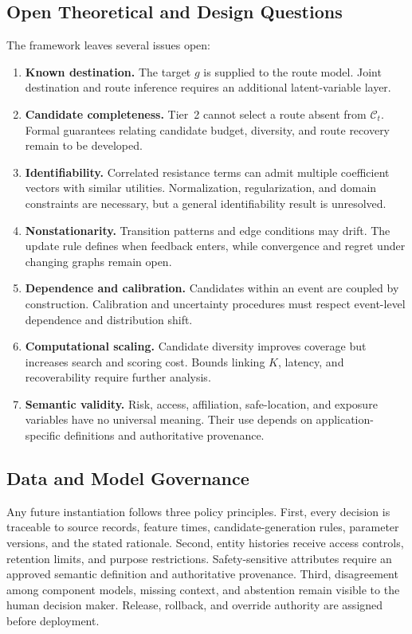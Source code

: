 \documentclass[11pt,letterpaper]{article}
\newcommand{\Ccal}{\mathcal{C}}
\begin{document}
\subsection{Open Theoretical and Design Questions}

The framework leaves several issues open:

\begin{enumerate}
  \item \textbf{Known destination.} The target $g$ is supplied to the route model. Joint destination and route inference requires an additional latent-variable layer.
  \item \textbf{Candidate completeness.} Tier~2 cannot select a route absent from $\Ccal_t$. Formal guarantees relating candidate budget, diversity, and route recovery remain to be developed.
  \item \textbf{Identifiability.} Correlated resistance terms can admit multiple coefficient vectors with similar utilities. Normalization, regularization, and domain constraints are necessary, but a general identifiability result is unresolved.
  \item \textbf{Nonstationarity.} Transition patterns and edge conditions may drift. The update rule defines when feedback enters, while convergence and regret under changing graphs remain open.
  \item \textbf{Dependence and calibration.} Candidates within an event are coupled by construction. Calibration and uncertainty procedures must respect event-level dependence and distribution shift.
  \item \textbf{Computational scaling.} Candidate diversity improves coverage but increases search and scoring cost. Bounds linking $K$, latency, and recoverability require further analysis.
  \item \textbf{Semantic validity.} Risk, access, affiliation, safe-location, and exposure variables have no universal meaning. Their use depends on application-specific definitions and authoritative provenance.
\end{enumerate}

\subsection{Data and Model Governance}

Any future instantiation follows three policy principles. First, every decision is traceable to source records, feature times, candidate-generation rules, parameter versions, and the stated rationale. Second, entity histories receive access controls, retention limits, and purpose restrictions. Safety-sensitive attributes require an approved semantic definition and authoritative provenance. Third, disagreement among component models, missing context, and abstention remain visible to the human decision maker. Release, rollback, and override authority are assigned before deployment.
\end{document}
